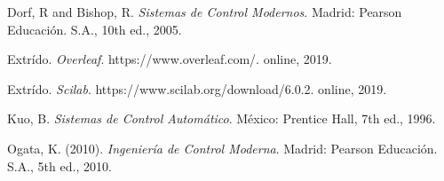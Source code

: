 \documentclass[12pt,letterpaper]{article}
\begin{document}
\begin{thebibliography}{1}
Dorf, R and Bishop, R. \emph{Sistemas de Control Modernos}. Madrid: Pearson Educación. S.A., 10th ed., 2005.

Extrído. \emph{Overleaf}. https://www.overleaf.com/. online, 2019.

Extrído. \emph{Scilab}. https://www.scilab.org/download/6.0.2. online, 2019.

Kuo, B. \emph{Sistemas de Control Automático}. México: Prentice Hall, 7th ed., 1996.

Ogata, K. (2010). \emph{Ingeniería de Control Moderna}. Madrid: Pearson Educación. S.A., 5th ed., 2010.

\end{thebibliography}


\nocite{*}


\end{document}

